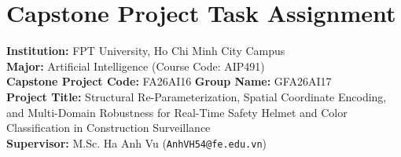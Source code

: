 \clearpage
\section*{Capstone Project Task Assignment}

\noindent
\textbf{Institution:} FPT University, Ho Chi Minh City Campus \\
\textbf{Major:} Artificial Intelligence (Course Code: AIP491) \\
\textbf{Capstone Project Code:} FA26AI16 \hfill \textbf{Group Name:} GFA26AI17 \\
\textbf{Project Title:} Structural Re-Parameterization, Spatial Coordinate Encoding, and Multi-Domain Robustness for Real-Time Safety Helmet and Color Classification in Construction Surveillance \\
\textbf{Supervisor:} M.Sc. Ha Anh Vu (\texttt{AnhVH54@fe.edu.vn})

